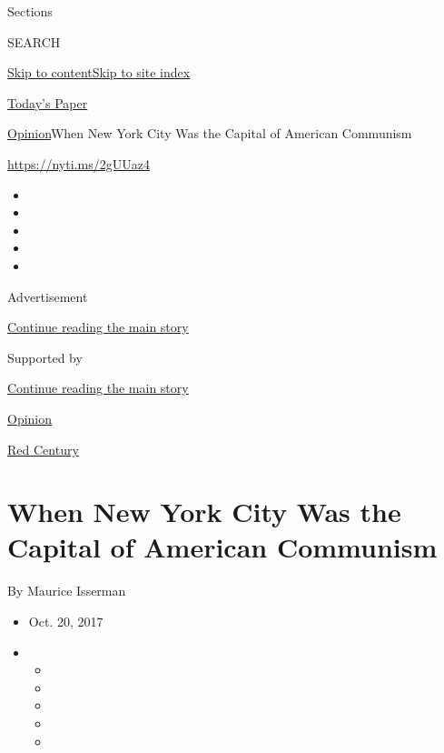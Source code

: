 Sections

SEARCH

\protect\hyperlink{site-content}{Skip to
content}\protect\hyperlink{site-index}{Skip to site index}

\href{https://myaccount.nytimes3xbfgragh.onion/auth/login?response_type=cookie\&client_id=vi}{}

\href{https://www.nytimes3xbfgragh.onion/section/todayspaper}{Today's
Paper}

\href{/section/opinion}{Opinion}\textbar{}When New York City Was the
Capital of American Communism

\url{https://nyti.ms/2gUUaz4}

\begin{itemize}
\item
\item
\item
\item
\item
\end{itemize}

Advertisement

\protect\hyperlink{after-top}{Continue reading the main story}

Supported by

\protect\hyperlink{after-sponsor}{Continue reading the main story}

\href{/section/opinion}{Opinion}

\href{/column/red-century}{Red Century}

\hypertarget{when-new-york-city-was-the-capital-of-american-communism}{%
\section{When New York City Was the Capital of American
Communism}\label{when-new-york-city-was-the-capital-of-american-communism}}

By Maurice Isserman

\begin{itemize}
\item
  Oct. 20, 2017
\item
  \begin{itemize}
  \item
  \item
  \item
  \item
  \item
  \end{itemize}
\end{itemize}


